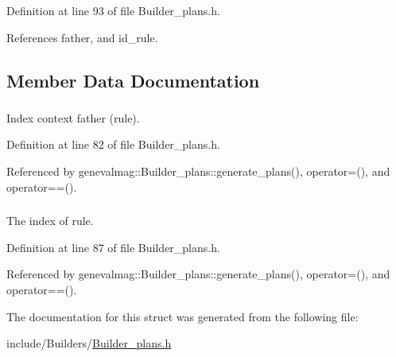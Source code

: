 Definition at line 93 of file Builder\_\-plans.h.

References father, and id\_\-rule.

\subsection{Member Data Documentation}
\hypertarget{structgenevalmag_1_1k__w_ef2a6d852e6beedc2247a9fc62033313}{
\subsubsection[{father}]{}}
\label{structgenevalmag_1_1k__w_ef2a6d852e6beedc2247a9fc62033313}


Index context father (rule). 



Definition at line 82 of file Builder\_\-plans.h.

Referenced by genevalmag::Builder\_\-plans::generate\_\-plans(), operator=(), and operator==().\hypertarget{structgenevalmag_1_1k__w_b31e8aba428c97c3717c5860509eb3cc}{
\subsubsection[{id\_\-rule}]{}}
\label{structgenevalmag_1_1k__w_b31e8aba428c97c3717c5860509eb3cc}


The index of rule. 



Definition at line 87 of file Builder\_\-plans.h.

Referenced by genevalmag::Builder\_\-plans::generate\_\-plans(), operator=(), and operator==().

The documentation for this struct was generated from the following file:\begin{CompactItemize}
\item 
include/Builders/\hyperlink{Builder__plans_8h}{Builder\_\-plans.h}\end{CompactItemize}
